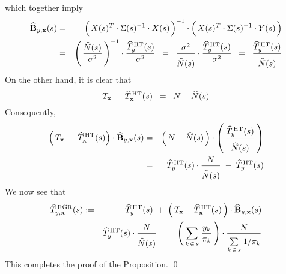 which together imply
\begin{eqnarray*}
\widehat{\mathbf{B}}_{y,\mathbf{x}}(s)
& = &
	\left(\,X(s)^{T} \overset{{\color{white}!}}{\cdot} \Sigma(s)^{-1} \cdot X(s)\,\right)^{-1}
	\cdot
	\left(\,X(s)^{T} \overset{{\color{white}!}}{\cdot} \Sigma(s)^{-1} \cdot Y(s) \,\right)
\\
& = &
	\left(\, \dfrac{\widehat{N}(s)}{\sigma^{2}} \,\right)^{-1}
	\cdot
	\dfrac{\widehat{T}^{\,\textnormal{HT}}_{y}(s)}{\sigma^{2}}
\;\; = \;\;
	\dfrac{\sigma^{2}}{\overset{{\color{white}.}}{\widehat{N}(s)}}
	\cdot
	\dfrac{\widehat{T}^{\,\textnormal{HT}}_{y}(s)}{\sigma^{2}}
\;\; = \;\;
	\dfrac{
		\widehat{T}^{\,\textnormal{HT}}_{y}(s)
	}{
		\overset{{\color{white}.}}{\widehat{N}(s)}
	}
\end{eqnarray*}
On the other hand, it is clear that
\begin{equation*}
T_{\mathbf{x}} \,-\, \widehat{T}^{\,\textnormal{HT}}_{\mathbf{x}}(s) \;\; = \;\; N - \widehat{N}(s)
\end{equation*}
Consequently,
\begin{eqnarray*}
\left(\,T_{\mathbf{x}} \,-\, \widehat{T}^{\,\textnormal{HT}}_{\mathbf{x}}(s)\right)
\cdot
\widehat{\mathbf{B}}_{y,\mathbf{x}}(s)
& = &
	\left(\,N - \widehat{N}(s) \,\right)
	\cdot
	\left(\,
		\dfrac{\widehat{T}^{\,\textnormal{HT}}_{y}(s)}{\overset{{\color{white}.}}{\widehat{N}(s)}}
	\,\right)
\\
& = &
	\widehat{T}^{\,\textnormal{HT}}_{y}(s) \cdot \dfrac{ N }{\overset{{\color{white}.}}{\widehat{N}(s)}}
	\; - \;
	\widehat{T}^{\,\textnormal{HT}}_{y}(s)
\end{eqnarray*}
We now see that
\begin{eqnarray*}
\widehat{T}^{\,\textnormal{RGR}}_{y,\mathbf{x}}(s)
& := &
	\widehat{T}^{\,\textnormal{HT}}_{y}(s)
	\; + \;
	\left(\,T_{\mathbf{x}} - \widehat{T}^{\,\textnormal{HT}}_{\mathbf{x}}(s) \,\right)
	\cdot
	\widehat{\mathbf{B}}_{y,\mathbf{x}}(s)
\\
& = &
	\widehat{T}^{\,\textnormal{HT}}_{y}(s)
	\cdot
	\dfrac{
		N
		}{
		\overset{{\color{white}.}}{\widehat{N}(s)}
		}
\;\; = \;\;
	\left(\, \underset{k\,\in\,s}{\sum}\; \dfrac{ y_{k} }{ \pi_{k} } \,\right)
	\cdot
	\dfrac{
		N
		}{
		\underset{k\,\in\,s}{\overset{{\color{white}.}}{\sum}}\; 1/\pi_{k}
		}
\end{eqnarray*}
This completes the proof of the Proposition.
\qed


\renewcommand{\theenumi}{\roman{enumi}}
\renewcommand{\labelenumi}{\textnormal{(\theenumi)}$\;\;$}


